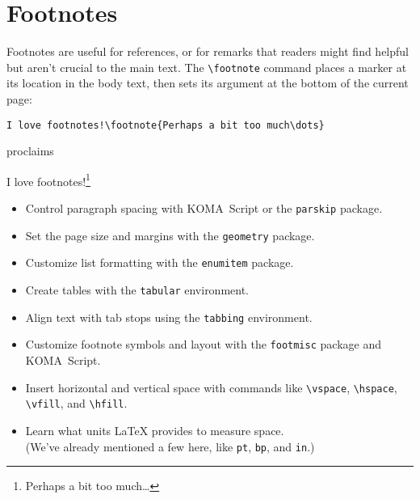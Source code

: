 \section{Footnotes}

Footnotes are useful for references,
or for remarks that readers might find helpful
but aren't crucial to the main text.
The \verb|\footnote| command places a marker at its location in the
body text, then sets its argument at the bottom of the current
page:
\begin{leftfigure}
\begin{lstlisting}
I love footnotes!\footnote{Perhaps a bit too much\dots}
\end{lstlisting}
\end{leftfigure}
proclaims
\begin{leftfigure}
\lm%
I love footnotes!\footnote{Perhaps a bit too much\dots}
\end{leftfigure}

\exercises{}
\begin{itemize}
\item Control paragraph spacing with KOMA~Script or the \texttt{parskip} package.
\item Set the page size and margins with the \texttt{geometry} package.
\item Customize list formatting with the \texttt{enumitem} package.
\item Create tables with the \texttt{tabular} environment.
\item Align text with tab stops using the \texttt{tabbing} environment.
\item Customize footnote symbols and layout with the \texttt{footmisc} package
    and KOMA~Script.
\item Insert horizontal and vertical space with commands like
    \verb|\vspace|, \verb|\hspace|, \verb|\vfill|, and \verb|\hfill|.
\item Learn what units \LaTeX{} provides to measure space. \\
    (We've already mentioned a few here, like
    \texttt{pt}, \texttt{bp}, and \texttt{in}.)
\end{itemize}
